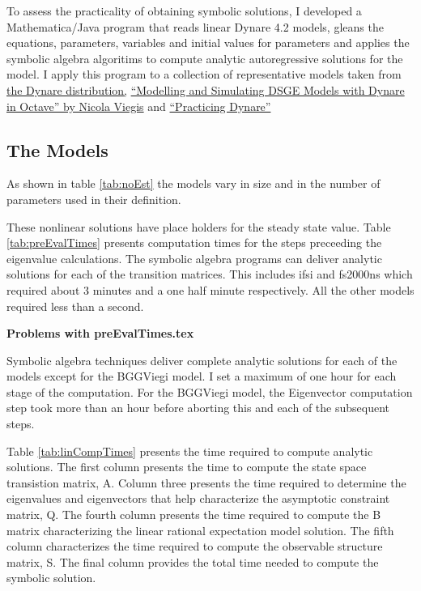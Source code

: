 \documentclass[12pt]{elsart}
\begin{document}
To assess the practicality of obtaining symbolic solutions, I developed
a Mathematica/Java program that
reads linear Dynare 4.2 models, gleans the equations,  parameters, 
variables and   initial values for parameters and 
applies the symbolic algebra algoritims to compute analytic 
autoregressive solutions for the model.
I apply this program to a collection of representative models taken from 
\href{http://www.dynare.org/documentation-and-support/faq/basics}{the Dynare distribution,}
\href{http://www.nviegi.net/research/dsge.htm}{``Modelling and Simulating DSGE Models with Dynare in Octave'' by Nicola Viegis} and 
\href{http://homepages.nyu.edu/~ts43/research/AP_tom16.pdf}{``Practicing Dynare''\cite{bhandari10}}


    \subsection{The Models }
As shown in table \ref{tab:noEst} the models vary in size and in the number of parameters used in their
definition.



  These nonlinear solutions have place holders for the steady state value.
Table \ref{tab:preEvalTimes} presents computation times for the steps
preceeding the eigenvalue calculations.
The symbolic algebra programs can deliver analytic solutions for
each of the transition matrices. This includes ifsi and fs2000ns which required
about 3 minutes and a one half minute respectively. All the other models required less than a second.



%

{\bf Problems with {preEvalTimes.tex} }

Symbolic algebra techniques deliver complete 
analytic solutions for each of the
models except for the BGGViegi model. 
I set a maximum of one hour for each stage of the computation.
For the BGGViegi model, the Eigenvector computation 
step took more than an hour before aborting this and each of the subsequent 
steps.





Table \ref{tab:linCompTimes} presents the time required to compute analytic 
solutions. The first column presents the time to compute the state space 
transistion matrix, A. Column three presents the time required to determine
the eigenvalues and eigenvectors that help characterize the asymptotic
constraint matrix, Q. The fourth column presents the time required to
compute the B matrix characterizing the linear rational expectation  model
solution.  The fifth column characterizes the time required to compute
the observable structure matrix, S.  The final column provides the
total time needed to compute the symbolic solution. 
\end{document}
